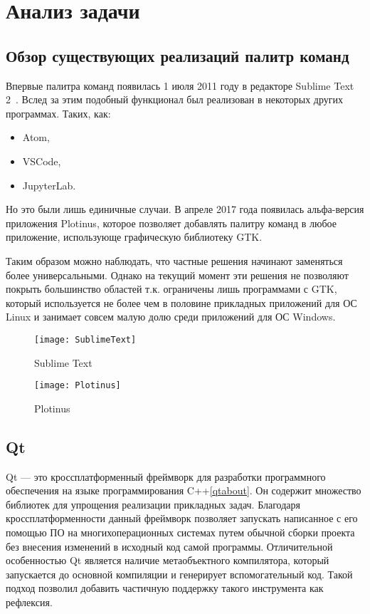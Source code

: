 \chapter{Анализ задачи}

\section{Обзор существующих реализаций палитр команд}\label{analogs}

Впервые палитра команд появилась 1 июля 2011 году в редакторе Sublime Text
2~\cite{sublimetext2changelog}. Вслед за этим подобный функционал был реализован
в некоторых других программах. Таких, как:
\begin{itemize}
	\item Atom\cite{atom},
	\item VSCode\cite{vscode},
	\item JupyterLab\cite{jupyterlab}.
\end{itemize}

Но это были лишь единичные случаи. В апреле 2017 года появилась альфа-версия
приложения Plotinus\cite{plotinus}, которое позволяет добавлять палитру команд в
любое приложение, использующе графическую библиотеку GTK.

Таким образом можно наблюдать, что частные решения начинают заменяться более
универсальными. Однако на текущий момент эти решения не позволяют покрыть
большинство областей т.к. ограничены лишь программами с GTK, который
используется не более чем в половине прикладных приложений для ОС Linux и
занимает совсем малую долю среди приложений для ОС Windows.

\begin{figure}[h]
	\centering
	\texttt{[image: SublimeText]}
	\label{sublimetext}
	\caption{Sublime Text}
\end{figure}

\begin{figure}[h]
	\centering
	\texttt{[image: Plotinus]}
	\caption{Plotinus}
\end{figure}

\section{Qt}

Qt — это кроссплатформенный фреймворк для разработки программного обеспечения
на языке программирования C++\ref{qtabout}. Он содержит множество библиотек для
упрощения реализации прикладных задач. Благодаря кроссплатформенности данный
фреймворк позволяет запускать написанное с его помощью ПО на многихоперационных
системах путем обычной сборки проекта без внесения изменений в исходный код
самой программы. Отличительной особенностью Qt является наличие метаобъектного
компилятора, который запускается до основной компиляции и генерирует
вспомогательный код. Такой подход позволил добавить частичную поддержку такого
инструмента как рефлексия.

